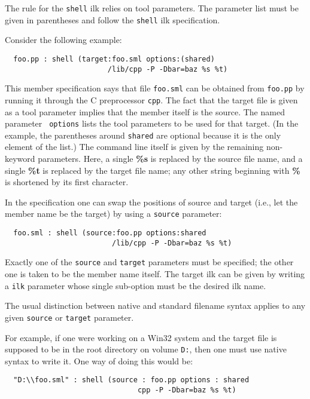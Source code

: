 The rule for the {\tt shell} ilk relies on tool parameters.  The
parameter list must be given in parentheses and follow the {\tt shell}
ilk specification.

Consider the following example:

\begin{verbatim}
  foo.pp : shell (target:foo.sml options:(shared)
                        /lib/cpp -P -Dbar=baz %s %t)
\end{verbatim}

This member specification says that file {\tt foo.sml} can be obtained
from {\tt foo.pp} by running it through the C preprocessor {\tt cpp}.
The fact that the target file is given as a tool parameter implies
that the member itself is the source.  The named parameter {\tt
options} lists the tool parameters to be used for that target. (In the
example, the parentheses around {\tt shared} are optional because it
is the only element of the list.) The command line itself is given by
the remaining non-keyword parameters.  Here, a single {\bf \%s} is
replaced by the source file name, and a single {\bf \%t} is replaced
by the target file name; any other string beginning with {\bf \%} is
shortened by its first character.

In the specification one can swap the positions of source and target
(i.e., let the member name be the target) by using a {\tt source}
parameter:

\begin{verbatim}
  foo.sml : shell (source:foo.pp options:shared
                         /lib/cpp -P -Dbar=baz %s %t)
\end{verbatim}

Exactly one of the {\tt source} and {\tt target} parameters must be
specified; the other one is taken to be the member name itself.  The
target ilk can be given by writing a {\tt ilk} parameter whose
single sub-option must be the desired ilk name.

The usual distinction between native and standard filename syntax
applies to any given {\tt source} or {\tt target} parameter.

For example, if one were working on a Win32 system and the target file
is supposed to be in the root directory on volume {\tt D:},
then one must use native syntax to write it.  One way of doing this
would be:

\begin{verbatim}
  "D:\\foo.sml" : shell (source : foo.pp options : shared
                               cpp -P -Dbar=baz %s %t)
\end{verbatim}

